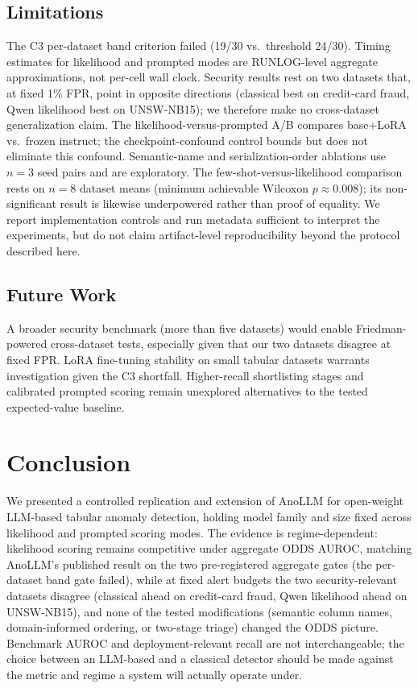 \documentclass[conference]{IEEEtran}
\begin{document}
\subsection{Limitations}
The C3 per-dataset band criterion failed (19/30 vs.\ threshold 24/30).
Timing estimates for likelihood and prompted modes are RUNLOG-level aggregate approximations, not per-cell wall clock.
Security results rest on two datasets that, at fixed 1\% FPR, point in opposite directions (classical best on credit-card fraud, Qwen likelihood best on UNSW-NB15); we therefore make no cross-dataset generalization claim.
The likelihood-versus-prompted A/B compares base+LoRA vs.\ frozen instruct; the checkpoint-confound control bounds but does not eliminate this confound.
Semantic-name and serialization-order ablations use $n=3$ seed pairs and are exploratory.
The few-shot-versus-likelihood comparison rests on $n=8$ dataset means (minimum achievable Wilcoxon $p\approx0.008$); its non-significant result is likewise underpowered rather than proof of equality.
We report implementation controls and run metadata sufficient to interpret the experiments, but do not claim artifact-level reproducibility beyond the protocol described here.

\subsection{Future Work}
A broader security benchmark (more than five datasets) would enable Friedman-powered cross-dataset tests, especially given that our two datasets disagree at fixed FPR.
LoRA fine-tuning stability on small tabular datasets warrants investigation given the C3 shortfall.
Higher-recall shortlisting stages and calibrated prompted scoring remain unexplored alternatives to the tested expected-value baseline.

\section{Conclusion}\label{sec:conclusion}
We presented a controlled replication and extension of AnoLLM for open-weight LLM-based tabular anomaly detection, holding model family and size fixed across likelihood and prompted scoring modes.
The evidence is regime-dependent: likelihood scoring remains competitive under aggregate ODDS AUROC, matching AnoLLM's published result on the two pre-registered aggregate gates (the per-dataset band gate failed), while at fixed alert budgets the two security-relevant datasets disagree (classical ahead on credit-card fraud, Qwen likelihood ahead on UNSW-NB15), and none of the tested modifications (semantic column names, domain-informed ordering, or two-stage triage) changed the ODDS picture.
Benchmark AUROC and deployment-relevant recall are not interchangeable; the choice between an LLM-based and a classical detector should be made against the metric and regime a system will actually operate under.
\end{document}
